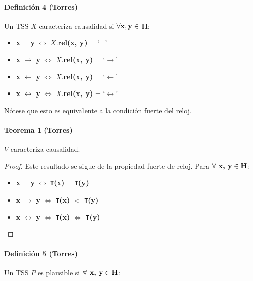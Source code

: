 \documentclass[12pt, times]{simauth}
\begin{document}
\paragraph{Definición 4 (Torres)} Un TSS $X$ caracteriza causalidad si $\forall \text{\textbf{x}}, \text{\textbf{y}} \in$ \textbf{H}:
\begin{itemize}
    \item[]\textbf{x} = \textbf{y} $\Leftrightarrow$ $X$.\textbf{rel(x, y)} = \textquoteleft=\textquoteright
    \item[]\textbf{x} $\to$ \textbf{y} $\Leftrightarrow$ $X$.\textbf{rel(x, y)} = \textquoteleft$\to$\textquoteright
    \item[]\textbf{x} $\leftarrow$ \textbf{y} $\Leftrightarrow$ $X$.\textbf{rel(x, y)} = \textquoteleft$\leftarrow$\textquoteright
    \item[]\textbf{x} $\leftrightarrow$ \textbf{y} $\Leftrightarrow$ $X$.\textbf{rel(x, y)} = \textquoteleft$\leftrightarrow$\textquoteright            
\end{itemize}

Nótese que esto es equivalente a la condición fuerte del reloj.

\paragraph{Teorema 1 (Torres)} $V$ caracteriza causalidad.

\begin{proof}
Este resultado se sigue de la propiedad fuerte de reloj. Para $\forall \text{\textbf{ x, y}} \in \text{\textbf{H}}$:
\begin{itemize}
    \item \textbf{x} = \textbf{y} $\Leftrightarrow$ \textbf{\texttt{T}(x)} = \textbf{\texttt{T}(y)}
    \item \textbf{x} $\to$ \textbf{y} $\Leftrightarrow$ \textbf{\texttt{T}(x)} $<$ \textbf{\texttt{T}(y)}
    \item \textbf{x} $\leftrightarrow$ \textbf{y} $\Leftrightarrow$ \textbf{\texttt{T}(x)} $\Leftrightarrow$ \textbf{\texttt{T}(y)}        
\end{itemize}

\end{proof}

\paragraph{Definición 5 (Torres)} Un TSS $P$ es plausible si $\forall \text{\textbf{ x, y}} \in \text{\textbf{H}}$:
\end{document}
